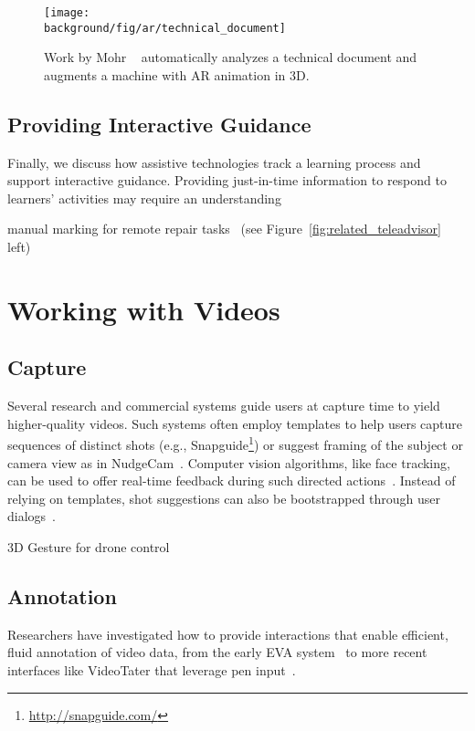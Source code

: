 \begin{figure*}[t!]
  \centering
  \texttt{[image: \\background/fig/ar/technical\_document]}
  \caption{Work by Mohr \ea{}~\cite{Mohr:2015:RTD:2702123.2702490} automatically analyzes a technical document and augments a machine with AR animation in 3D.}
  \label{fig:related_ar_annotation}
\end{figure*}

\subsection{Providing Interactive Guidance}
Finally, we discuss how assistive technologies track a learning process and support interactive guidance. Providing just-in-time information to respond to learners' activities may require an understanding

manual marking for remote repair tasks~\cite{Gurevich:2012ko} (see Figure~\ref{fig:related_teleadvisor} left)




\section{Working with Videos}
\label{related_videos}


\subsection{Capture}
Several research and commercial systems guide users at capture time to yield higher-quality videos. Such systems often employ templates to help users capture sequences of distinct shots (e.g., Snapguide\footnote{\url{http://snapguide.com/}}) or suggest framing of the subject or camera view as in NudgeCam~\cite{Carter:2010}. Computer vision algorithms, like face tracking, can be used to offer real-time feedback during such directed actions~\cite{Davis:2003cu,Heer:2004ba,Carter:2010}. Instead of relying on templates, shot suggestions can also be bootstrapped through user dialogs~\cite{Adams:2005}.

3D Gesture for drone control~\cite{Cauchard:2015:DME:2750858.2805823,Pfeil:2013:EGM:2449396.2449429}


\subsection{Annotation}
Researchers have investigated how to provide interactions that enable efficient, fluid annotation of video data, from the early EVA system~\cite{Mackay:1989} to more recent interfaces like VideoTater that leverage pen input~\cite{Diakopoulos:2006vt}.

